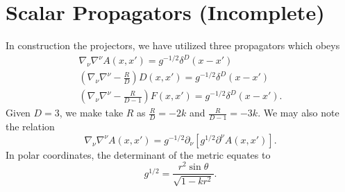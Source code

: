 \documentclass[10pt,letterpaper]{article}
\numberwithin{equation}{subsection}
\begin{document}
\section{Scalar Propagators (Incomplete)}
In construction the projectors, we have utilized three propagators which obeys
\begin{align}
\nabla_\nu \nabla^\nu A(x,x') = g^{-1/2} \delta^D(x-x')
\nonumber\\
\left( \nabla_\nu \nabla^\nu -\frac{R}{D} \right)D(x,x') = g^{-1/2} \delta^D(x-x')
\nonumber\\
\left( \nabla_\nu \nabla^\nu -\frac{R}{D-1} \right)F(x,x') = g^{-1/2} \delta^D(x-x').
\end{align}
Given $D=3$, we make take $R$ as $\frac{R}{D} = -2k$ and $\frac{R}{D-1} = -3k$. We may also note the relation
\begin{equation}
\nabla_\nu \nabla^\nu A(x,x') = g^{-1/2} \partial_\nu [g^{1/2} \partial^\nu A(x,x')].
\end{equation}
In polar coordinates, the determinant of the metric equates to
\begin{equation}
g^{1/2} = \frac{r^2 \sin\theta}{\sqrt{1-kr^2}}.
\end{equation}
\end{document}
